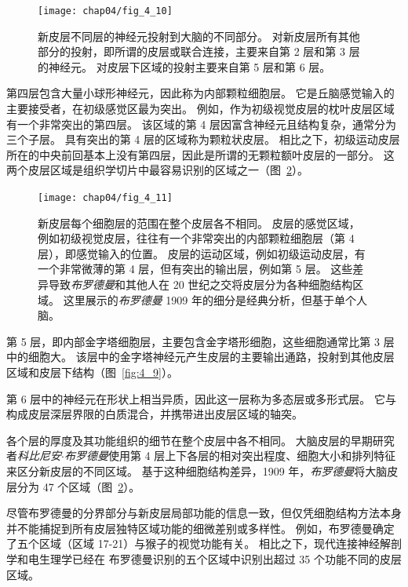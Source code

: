 \begin{figure}[htbp]
	\centering
	\texttt{[image: chap04/fig\_4\_10]}
	\caption{新皮层不同层的神经元投射到大脑的不同部分。
		对新皮层所有其他部分的投射，即所谓的皮层或联合连接，主要来自第 2 层和第 3 层的神经元。
		对皮层下区域的投射主要来自第 5 层和第 6 层\cite{jones1986connectivity}。}
	\label{fig:4_10}
\end{figure}


第四层包含大量小球形神经元，因此称为内部颗粒细胞层。 
它是丘脑感觉输入的主要接受者，在初级感觉区最为突出。 
例如，作为初级视觉皮层的枕叶皮层区域有一个非常突出的第四层。 
该区域的第 4 层因富含神经元且结构复杂，通常分为三个子层。 
具有突出的第 4 层的区域称为颗粒状皮层。 
相比之下，初级运动皮层所在的中央前回基本上没有第四层，因此是所谓的无颗粒额叶皮层的一部分。 
这两个皮层区域是组织学切片中最容易识别的区域之一（图~\ref{fig:4_11}）。

\begin{figure}[htbp]
	\centering
	\texttt{[image: chap04/fig\_4\_11]}
	\caption{新皮层每个细胞层的范围在整个皮层各不相同。
		皮层的感觉区域，例如初级视觉皮层，往往有一个非常突出的内部颗粒细胞层（第 4 层），即感觉输入的位置。
		皮层的运动区域，例如初级运动皮层，有一个非常微薄的第 4 层，但有突出的输出层，例如第 5 层。
		这些差异导致\textit{布罗德曼}和其他人在 20 世纪之交将皮层分为各种细胞结构区域。
		这里展示的\textit{布罗德曼} 1909 年的细分是经典分析，但基于单个人脑\cite{martin2012neuroanatomy}。}
	\label{fig:4_11}
\end{figure}


第 5 层，即内部金字塔细胞层，主要包含金字塔形细胞，这些细胞通常比第 3 层中的细胞大。
该层中的金字塔神经元产生皮层的主要输出通路，投射到其他皮层区域和皮层下结构（图~\ref{fig:4_9}）。


第 6 层中的神经元在形状上相当异质，因此这一层称为多态层或多形式层。 
它与构成皮层深层界限的白质混合，并携带进出皮层区域的轴突。


各个层的厚度及其功能组织的细节在整个皮层中各不相同。 
大脑皮层的早期研究者\textit{科比尼安$\cdot$布罗德曼}使用第 4 层上下各层的相对突出程度、细胞大小和排列特征来区分新皮层的不同区域。 
基于这种细胞结构差异，1909 年，\textit{布罗德曼}将大脑皮层分为 47 个区域（图~\ref{fig:4_11}）。


尽管布罗德曼的分界部分与新皮层局部功能的信息一致，但仅凭细胞结构方法本身并不能捕捉到所有皮层独特区域功能的细微差别或多样性。
例如，布罗德曼确定了五个区域（区域 17-21）与猴子的视觉功能有关。 
相比之下，现代连接神经解剖学和电生理学已经在 布罗德曼识别的五个区域中识别出超过 35 个功能不同的皮层区域。


